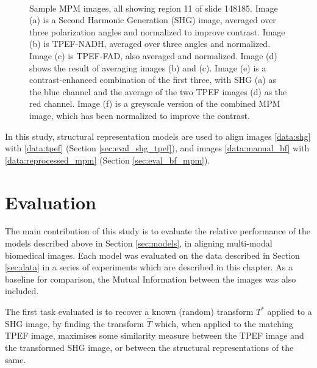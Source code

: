 \documentclass{report}
\begin{document}
\begin{figure}
 \\
\caption{Sample MPM images, all showing region 11 of slide 148185. Image (a) is a Second Harmonic Generation (SHG) image, averaged over three polarization angles and normalized to improve contrast. Image (b) is TPEF-NADH, averaged over three angles and normalized. Image (c) is TPEF-FAD, also averaged and normalized. Image (d) shows the result of averaging images (b) and (c).
Image (e) is a contrast-enhanced combination of the first three, with SHG (a) as the blue channel and the average of the two TPEF images (d) as the red channel. Image (f) is a greyscale version of the combined MPM image, which has been normalized to improve the contrast.}
\label{fig:example_imageset_mpm}
\end{figure}
In this study, structural representation models are used to align images \ref{data:shg} with \ref{data:tpef} (Section \ref{sec:eval_shg_tpef}), and images \ref{data:manual_bf} with \ref{data:reprocessed_mpm} (Section \ref{sec:eval_bf_mpm}).


\chapter{Evaluation}
\label{sec:evaluation}
The main contribution of this study is to evaluate the relative performance of the models described above in Section \ref{sec:models}, in aligning multi-modal biomedical images. Each model was evaluated on the data described in Section \ref{sec:data} in a series of experiments which are described in this chapter. As a baseline for comparison, the Mutual Information between the images was also included.

The first task evaluated is to recover a known (random) transform $T^*$ applied to a SHG image, by finding the transform $\hat{T}$ which, when applied to the matching TPEF image, maximises some similarity measure between the TPEF image and the transformed SHG image, or between the structural representations of the same.
\end{document}
